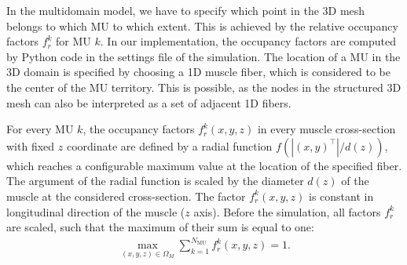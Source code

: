 In the multidomain model, we have to specify which point in the 3D mesh belongs to which MU to which extent. This is achieved by the relative occupancy factors $f_r^{k}$ for MU $k$.
In our implementation, the occupancy factors are computed by Python code in the settings file of the simulation.
The location of a MU in the 3D domain is specified by choosing a 1D muscle fiber, which is considered to be the center of the MU territory. This is possible, as the nodes in the structured 3D mesh can also be interpreted as a set of adjacent 1D fibers.

For every MU $k$, the occupancy factors $f_r^k(x,y,z)$ in every muscle cross-section with fixed $z$ coordinate are defined by a radial function $f(|(x,y)^\top|/d(z))$, which reaches a configurable maximum value at the location of the specified fiber. The argument of the radial function is scaled by the diameter $d(z)$ of the muscle at the considered cross-section. The factor $f_r^k(x,y,z)$ is constant in longitudinal direction of the muscle ($z$ axis). Before the simulation, all factors $f_r^k$ are scaled, such that the maximum of their sum is equal to one:%
\begin{align*}
  \max\limits_{(x,y,z)\in\Omega_M} \sum_{k=1}^{N_\text{MU}} f_r^k(x,y,z) = 1.
\end{align*}

